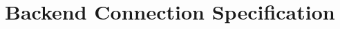 \documentclass[a4paper, 12pt, titlepage, headsepline, listof = totoc, bibliography = totoc, numbers = noenddot]{scrbook} %
\begin{document}
\chapter{Backend Connection Specification} \label{chp:appendix:backend-ws-spec}




\setcounter{secnumdepth}{0}





%
%

\end{document}
